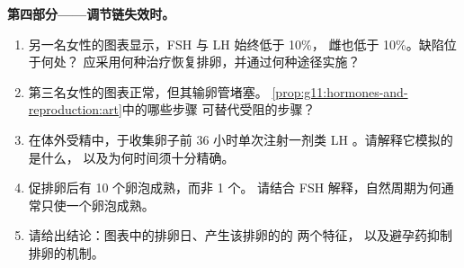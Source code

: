 \begin{problem}
\medskip
\noindent\textbf{第四部分——调节链失效时。}
\begin{enumerate}[resume]
  \item 另一名女性的图表显示，FSH 与 LH 始终低于 10\%，
        雌也低于 10\%。缺陷位于何处？
        应采用何种治疗恢复排卵，并通过何种途径实施？
  \item 第三名女性的图表正常，但其输卵管堵塞。
        \cref{prop:g11:hormones-and-reproduction:art}中的哪些步骤
        可替代受阻的步骤？
  \item 在体外受精中，于收集卵子前 36
        小时单次注射一剂类 LH 。请解释它模拟的是什么，
        以及为何时间须十分精确。
  \item 促排卵后有 10 个卵泡成熟，而非 1 个。
        请结合 FSH 解释，自然周期为何通常只使一个卵泡成熟。
  \item 请给出结论：图表中的排卵日、产生该排卵的的
        两个特征，
        以及避孕药抑制排卵的机制。
\end{enumerate}
\end{problem}
